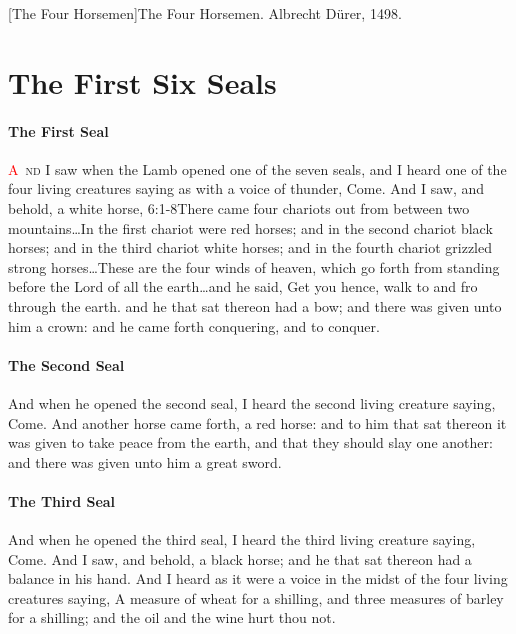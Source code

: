 [The Four Horsemen]{The Four Horsemen. Albrecht Dürer, 1498.}

\chapter{The First Six Seals}
\subsubsection*{The First Seal}
\lettrine[lines=3]{\textcolor{red}{A}}{\ nd} I saw when the Lamb opened one of the seven seals, and I heard one of the four living creatures saying as with a voice of thunder, Come. 
And I saw, and behold, a white horse,%
					{6:1-8}{There came four chariots out from between two mountains\ldots In the first chariot were red horses; and in the second chariot black horses; and in the third chariot white horses; and in the fourth chariot grizzled strong horses\ldots These are the four winds of heaven, which go forth from standing before the Lord of all the earth\ldots and he said, Get you hence, walk to and fro through the earth.} %
and he that sat thereon had a bow; and there was given unto him a crown: and he came forth conquering, and to conquer.
\subsubsection*{The Second Seal}
And when he opened the second seal, I heard the second living creature saying, Come. %
And another horse came forth, a red horse: and to him that sat thereon it was given to take peace from the earth, and that they should slay one another: and there was given unto him a great sword.
\subsubsection*{The Third Seal}
And when he opened the third seal, I heard the third living creature saying, Come. And I saw, and behold, a black horse; and he that sat thereon had a balance in his hand. %
 And I heard as it were a voice in the midst of the four living creatures saying, A measure of wheat for a shilling, and three measures of barley for a shilling; and the oil and the wine hurt thou not.
